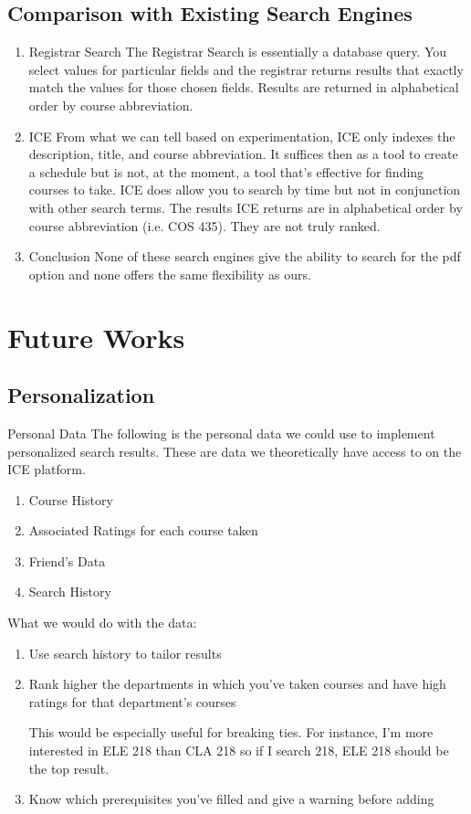 \documentclass[12pt,letterpaper]{article}
\begin{document}
\subsection{Comparison with Existing Search Engines}
\begin{enumerate}
\item Registrar Search
  The Registrar Search is essentially a database query. You select values for particular fields and the registrar returns results that exactly match the values for those chosen fields. Results are returned in alphabetical order by course abbreviation. 
  
\item ICE
  From what we can tell based on experimentation, ICE only indexes the description, title, and course abbreviation. It suffices then as a tool to create a schedule but is not, at the moment, a tool that's effective for finding courses to take. ICE does allow you to search by time but not in conjunction with other search terms. The results ICE returns are in alphabetical order by course abbreviation (i.e. COS 435). They are not truly ranked.  
  
\item Conclusion
  None of these search engines give the ability to search for the pdf option and none offers the same flexibility as ours.
\end{enumerate}

\section{Future Works}

\subsection{Personalization}

Personal Data
The following is the personal data we could use to implement personalized search results. These are data we theoretically have access to on the ICE platform.
\begin{enumerate}
\item Course History
\item Associated Ratings for each course taken
\item Friend's Data
\item Search History
\end{enumerate}
What we would do with the data:
\begin{enumerate}
\item Use search history to tailor results

\item Rank higher the departments in which you've taken courses and have high ratings for that department's courses

This would be especially useful for breaking ties. For instance, I'm more interested in ELE 218 than CLA 218 so if I search 218, ELE 218 should be the top result. 

\item Know which prerequisites you've filled and give a warning before adding

\end{enumerate}
\end{document}
